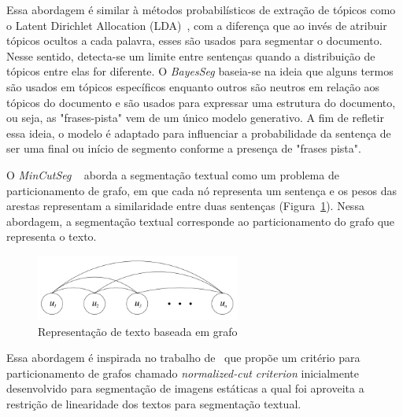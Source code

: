 Essa abordagem é similar à métodos probabilísticos de extração de tópicos como o Latent Dirichlet Allocation (LDA)~\cite{Blei2003}, com a diferença que ao invés de atribuir tópicos ocultos a cada palavra, esses são usados para segmentar o documento. Nesse sentido, detecta-se um limite entre sentenças quando a distribuição de tópicos entre elas for diferente.  O \textit{BayesSeg} baseia-se na ideia que alguns termos são usados em tópicos específicos enquanto outros são neutros em relação aos tópicos do documento e são usados para expressar uma estrutura do documento, ou seja, as "frases-pista" vem de um único modelo generativo. A fim de refletir essa ideia, o modelo é adaptado para influenciar a probabilidade da sentença de ser uma final ou início de segmento conforme a presença de "frases pista".








O \textit{MinCutSeg} ~\cite{Malioutov:2006a} aborda a segmentação textual como um problema de particionamento de grafo, em que cada nó representa um sentença e os pesos das arestas representam a similaridade entre duas sentenças (Figura~\ref{fig:representacao-texto-grafo}). Nessa abordagem, a segmentação textual corresponde ao particionamento do grafo que representa o texto.


  \begin{figure}[!h]
	  \centering
	  \includegraphics[width=0.6\textwidth]{conteudo/capitulos/figs/graph-representation-of-text.png}
	  \caption{Representação de texto baseada em grafo~\cite{Malioutov:2006a}}
	  \label{fig:representacao-texto-grafo}
  \end{figure}


Essa abordagem é inspirada no trabalho de~\cite{Shi2000} que propõe um critério para particionamento de grafos chamado \textit{normalized-cut criterion} inicialmente desenvolvido para segmentação de imagens estáticas a qual foi aproveita a restrição de linearidade dos textos para segmentação textual.

